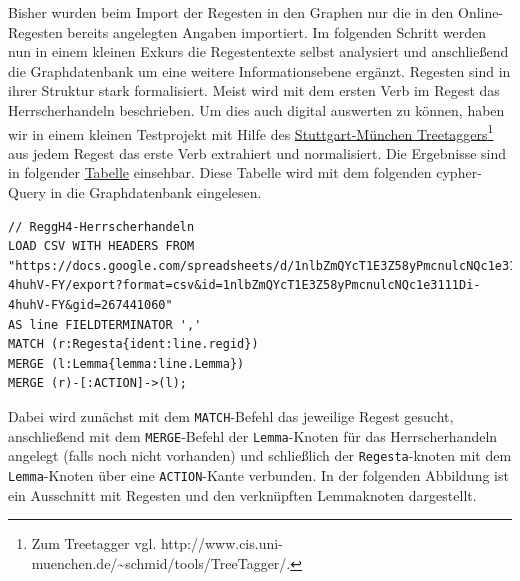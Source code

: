 \documentclass[ngerman,]{scrreprt}
\begin{document}
Bisher wurden beim Import der Regesten in den Graphen nur die in den Online-Regesten bereits angelegten Angaben importiert. Im folgenden Schritt werden nun in einem kleinen Exkurs die Regestentexte selbst analysiert und anschließend die Graphdatenbank um eine weitere Informationsebene ergänzt. Regesten sind in ihrer Struktur stark formalisiert. Meist wird mit dem ersten Verb im Regest das Herrscherhandeln beschrieben. Um dies auch digital auswerten zu können, haben wir in einem kleinen Testprojekt mit Hilfe des \href{http://www.cis.uni-muenchen.de/~schmid/tools/TreeTagger/}{Stuttgart-München Treetaggers}\footnote{Zum Treetagger vgl. http://www.cis.uni-muenchen.de/\textasciitilde{}schmid/tools/TreeTagger/.} aus jedem Regest das erste Verb extrahiert und normalisiert. Die Ergebnisse sind in folgender \href{https://docs.google.com/spreadsheets/d/1nlbZmQYcT1E3Z58yPmcnulcNQc1e3111Di-4huhV-FY/edit?usp=sharing}{Tabelle} einsehbar. Diese Tabelle wird mit dem folgenden cypher-Query in die Graphdatenbank eingelesen.

\begin{verbatim}
// ReggH4-Herrscherhandeln
LOAD CSV WITH HEADERS FROM "https://docs.google.com/spreadsheets/d/1nlbZmQYcT1E3Z58yPmcnulcNQc1e3111Di-4huhV-FY/export?format=csv&id=1nlbZmQYcT1E3Z58yPmcnulcNQc1e3111Di-4huhV-FY&gid=267441060"
AS line FIELDTERMINATOR ','
MATCH (r:Regesta{ident:line.regid})
MERGE (l:Lemma{lemma:line.Lemma})
MERGE (r)-[:ACTION]->(l);
\end{verbatim}

Dabei wird zunächst mit dem \texttt{MATCH}-Befehl das jeweilige Regest gesucht, anschließend mit dem \texttt{MERGE}-Befehl der \texttt{Lemma}-Knoten für das Herrscherhandeln angelegt (falls noch nicht vorhanden) und schließlich der \texttt{Regesta}-knoten mit dem \texttt{Lemma}-Knoten über eine \texttt{ACTION}-Kante verbunden. In der folgenden Abbildung ist ein Ausschnitt mit Regesten und den verknüpften Lemmaknoten dargestellt.
\end{document}
